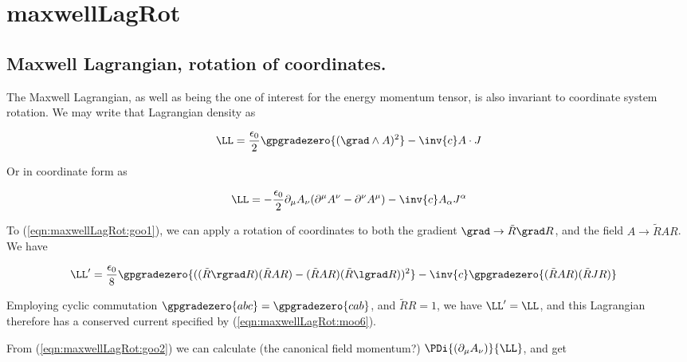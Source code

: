 

\chapter{maxwellLagRot}
\label{chap:maxwellLagRot}
{}
\date{Sept 5, 2009}

\beginArtNoToc

\section{Maxwell Lagrangian, rotation of coordinates.}

The Maxwell Lagrangian, as well as being the one of interest for the energy momentum tensor, is also invariant to coordinate system rotation.  We may write that Lagrangian density as

\begin{align}\label{eqn:maxwellLagRot:goo1}
\LL = \frac{\epsilon_0}{2} \gpgradezero{(\grad \wedge A)^2} - \inv{c} A \cdot J
\end{align}

Or in coordinate form as

\begin{align}\label{eqn:maxwellLagRot:goo2}
\LL = -\frac{\epsilon_0}{2} \partial_\mu A_\nu (\partial^\mu A^\nu - \partial^\nu A^\mu) - \inv{c} A_\alpha J^\alpha
\end{align}

To (\ref{eqn:maxwellLagRot:goo1}), we can apply a rotation of coordinates to both the gradient $\grad \rightarrow \tilde{R} \grad R$, and the field $A \rightarrow \tilde{R} A R$.  We have

\begin{align}\label{eqn:maxwellLagRot:goo3}
\LL' &= \frac{\epsilon_0}{8} \gpgradezero{((\tilde{R} \rgrad R) (\tilde{R} A R) - (\tilde{R} A R) (\tilde{R} \lgrad R))^2} - \inv{c} \gpgradezero{ (\tilde{R} A R) (\tilde{R} J R)}
\end{align}

Employing cyclic commutation $\gpgradezero{ a b c} = \gpgradezero{ c a b }$, and $\tilde{R} R = 1$, we have $\LL' = \LL$, and this Lagrangian therefore has a conserved current specified by (\ref{eqn:maxwellLagRot:moo6}).

From (\ref{eqn:maxwellLagRot:goo2}) we can calculate (the canonical field momentum?) $\PDi{(\partial_\mu {A}_\nu)}{\LL}$, and get

